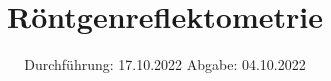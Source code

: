 

\subject{Versuch Nr.V44}
\title{Röntgenreflektometrie}
\date{%
  Durchführung: 17.10.2022
  \hspace{3em}
  Abgabe: 04.10.2022
}



\maketitle
\thispagestyle{empty}
\tableofcontents
\newpage 




% 
% 
%

\nocite{*}

\printbibliography{}


